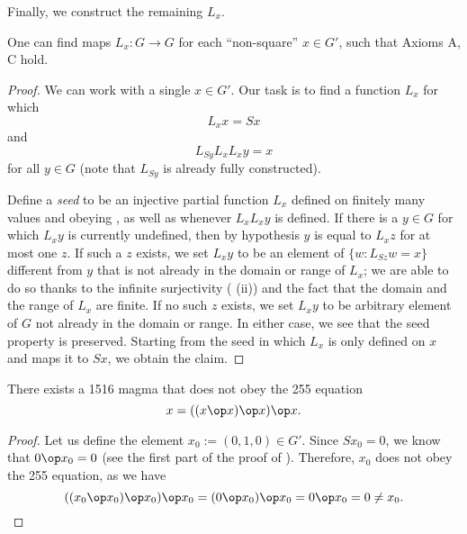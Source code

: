 Finally, we construct the remaining $L_x$.

\begin{proposition}\label{axiom-c} One can find maps $L_x: G \to G$ for each ``non-square'' $x \in G'$, such that Axioms A, C hold.
\end{proposition}

\begin{proof}  We can work with a single $x \in G'$.  Our task is to find a function $L_x$ for which
\begin{equation}\label{axioma-again}
   L_x x = Sx
\end{equation}
and
\begin{equation}\label{axiomb-again}
  L_{Sy} L_x L_x y = x
\end{equation}
for all $y \in G$ (note that $L_{Sy}$ is already fully constructed).

Define a \emph{seed} to be an injective partial function $L_x$ defined on finitely many values and obeying , as well as  whenever $L_x L_x y$ is defined.
If there is a $y \in G$ for which $L_x y$ is currently undefined, then by hypothesis $y$ is equal to $L_x z$ for at most one $z$.
If such a $z$ exists, we set $L_x y$ to be an element of $\{ w: L_{Sz} w = x \}$ different from $y$ that is not already in the domain or range of $L_x$; we are able to do so thanks to the infinite surjectivity ( (ii)) and the fact that the domain and the range of $L_x$ are finite.
If no such $z$ exists, we set $L_x y$ to be arbitrary element of $G$ not already in the domain or range.  In either case, we see that the seed property is preserved.  Starting from the seed in which $L_x$ is only defined on $x$ and maps it to $Sx$, we obtain the claim.
\end{proof}

\begin{corollary}\label{1516-no-255}  There exists a 1516 magma that does not obey the 255 equation $$x = ((x \op x) \op x) \op x.$$
\end{corollary}

\begin{proof}
  Let us define the element $x_0 := (0, 1, 0) \in G'$.
  Since $S x_0 = 0$, we know that $0 \op x_0 = 0$ (see the first part of the proof of ).
  Therefore, $x_0$ does not obey the 255 equation, as we have
  $$((x_0 \op x_0) \op x_0) \op x_0 = (0 \op x_0) \op x_0 = 0 \op x_0 = 0 \neq x_0.$$
\end{proof}
